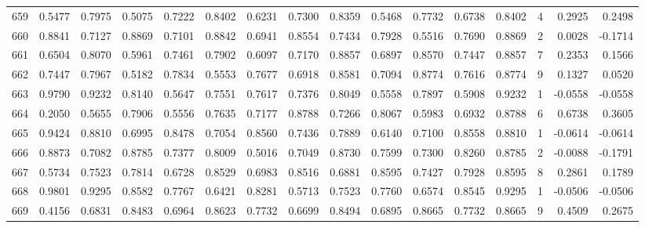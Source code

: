 \begin{tabular}{lrrrrrrrrrrrrrrr}
659 &      0.5477 &  0.7975 &  0.5075 &  0.7222 &  0.8402 &  0.6231 &  0.7300 &  0.8359 &  0.5468 &  0.7732 &   0.6738 &     0.8402 &      4 &                    0.2925 &                     0.2498 \\
660 &      0.8841 &  0.7127 &  0.8869 &  0.7101 &  0.8842 &  0.6941 &  0.8554 &  0.7434 &  0.7928 &  0.5516 &   0.7690 &     0.8869 &      2 &                    0.0028 &                    -0.1714 \\
661 &      0.6504 &  0.8070 &  0.5961 &  0.7461 &  0.7902 &  0.6097 &  0.7170 &  0.8857 &  0.6897 &  0.8570 &   0.7447 &     0.8857 &      7 &                    0.2353 &                     0.1566 \\
662 &      0.7447 &  0.7967 &  0.5182 &  0.7834 &  0.5553 &  0.7677 &  0.6918 &  0.8581 &  0.7094 &  0.8774 &   0.7616 &     0.8774 &      9 &                    0.1327 &                     0.0520 \\
663 &      0.9790 &  0.9232 &  0.8140 &  0.5647 &  0.7551 &  0.7617 &  0.7376 &  0.8049 &  0.5558 &  0.7897 &   0.5908 &     0.9232 &      1 &                   -0.0558 &                    -0.0558 \\
664 &      0.2050 &  0.5655 &  0.7906 &  0.5556 &  0.7635 &  0.7177 &  0.8788 &  0.7266 &  0.8067 &  0.5983 &   0.6932 &     0.8788 &      6 &                    0.6738 &                     0.3605 \\
665 &      0.9424 &  0.8810 &  0.6995 &  0.8478 &  0.7054 &  0.8560 &  0.7436 &  0.7889 &  0.6140 &  0.7100 &   0.8558 &     0.8810 &      1 &                   -0.0614 &                    -0.0614 \\
666 &      0.8873 &  0.7082 &  0.8785 &  0.7377 &  0.8009 &  0.5016 &  0.7049 &  0.8730 &  0.7599 &  0.7300 &   0.8260 &     0.8785 &      2 &                   -0.0088 &                    -0.1791 \\
667 &      0.5734 &  0.7523 &  0.7814 &  0.6728 &  0.8529 &  0.6983 &  0.8516 &  0.6881 &  0.8595 &  0.7427 &   0.7928 &     0.8595 &      8 &                    0.2861 &                     0.1789 \\
668 &      0.9801 &  0.9295 &  0.8582 &  0.7767 &  0.6421 &  0.8281 &  0.5713 &  0.7523 &  0.7760 &  0.6574 &   0.8545 &     0.9295 &      1 &                   -0.0506 &                    -0.0506 \\
669 &      0.4156 &  0.6831 &  0.8483 &  0.6964 &  0.8623 &  0.7732 &  0.6699 &  0.8494 &  0.6895 &  0.8665 &   0.7732 &     0.8665 &      9 &                    0.4509 &                     0.2675 \\

\end{tabular}
